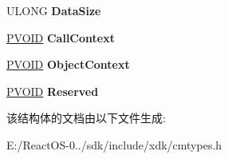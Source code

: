 \begin{DoxyCompactItemize}
\item 
\mbox{\label{struct___r_e_g___s_e_t___v_a_l_u_e___k_e_y___i_n_f_o_r_m_a_t_i_o_n_a6fefd28691e13f8494b259091ea431ce}} 
U\+L\+O\+NG {\bfseries Data\+Size}
\item 
\mbox{\label{struct___r_e_g___s_e_t___v_a_l_u_e___k_e_y___i_n_f_o_r_m_a_t_i_o_n_a52bc1faf4035af3e7fb2c384b5f5d631}} 
\hyperlink{interfacevoid}{P\+V\+O\+ID} {\bfseries Call\+Context}
\item 
\mbox{\label{struct___r_e_g___s_e_t___v_a_l_u_e___k_e_y___i_n_f_o_r_m_a_t_i_o_n_abacfe89770b4b07e42fe9e2b5c478372}} 
\hyperlink{interfacevoid}{P\+V\+O\+ID} {\bfseries Object\+Context}
\item 
\mbox{\label{struct___r_e_g___s_e_t___v_a_l_u_e___k_e_y___i_n_f_o_r_m_a_t_i_o_n_a67f0610d306b3e871c571b6b9c7c8a73}} 
\hyperlink{interfacevoid}{P\+V\+O\+ID} {\bfseries Reserved}
\end{DoxyCompactItemize}


该结构体的文档由以下文件生成\+:\begin{DoxyCompactItemize}
\item 
E\+:/\+React\+O\+S-\/0../sdk/include/xdk/cmtypes.\+h\end{DoxyCompactItemize}
